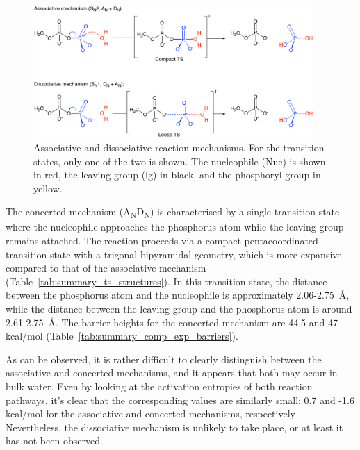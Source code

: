 \begin{figure}[t!]
    \centering
    \includegraphics[width=0.95\textwidth]{Figures/1_Introduction/intro_reaction_mechanism.pdf}
    \caption{Associative and dissociative reaction mechanisms. For the transition states, only one of the two is shown. The nucleophile (Nuc) is shown in red, the leaving group (lg) in black, and the phosphoryl group in yellow.}
    \label{fig:reaction-mechanism}
\end{figure}

The concerted mechanism (A\textsubscript{N}D\textsubscript{N}) is characterised by a single transition state \; where the nucleophile approaches the phosphorus atom while the leaving group remains attached. The reaction proceeds via a compact pentacoordinated transition state with a trigonal bipyramidal geometry, which is more expansive compared to that of the associative mechanism (Table~\ref{tab:summary_ts_structures}). In this transition state, the distance between the phosphorus atom and the nucleophile is approximately 2.06-2.75~\AA, while the distance between the leaving group and the phosphorus atom is around 2.61-2.75~\AA. The barrier heights for the concerted mechanism are 44.5 and 47 kcal/mol (Table~\ref{tab:summary_comp_exp_barriers}).

As can be observed, it is rather difficult to clearly distinguish between the associative and concerted mechanisms, and it appears that both may occur in bulk water. Even by looking at the activation entropies of both reaction pathways, it's clear that the corresponding values are similarly small: 0.7 and -1.6 kcal/mol for the associative and concerted mechanisms, respectively \citep{duarteResolvingApparentConflicts2015}.  Nevertheless, the dissociative mechanism is unlikely to take place, or at least it has not been observed.



